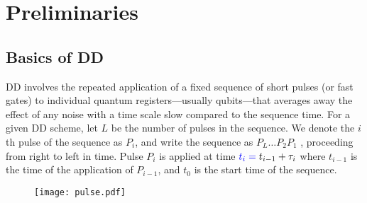 \documentclass[twocolumn,pra,superscriptaddress]{revtex4-2}
\begin{document}
\section{Preliminaries}
\noindent{}

\subsection{Basics of DD}

DD involves the repeated application of a fixed sequence of short pulses (or fast gates) to individual quantum registers---usually qubits---that averages away the effect of any noise with a time scale slow compared to the sequence time. For a given DD scheme, let $L$ be the number of pulses in the sequence. We denote the $i$th pulse of the sequence as $P_i$, and write the sequence as
$P_L \ldots P_2P_1$ ,
proceeding from right to left in time. Pulse $P_i$ is applied at time ${\color{blue}{t_i={} }}t_{i-1}+\tau_i$ where $t_{i-1}$ is the time of the application of $P_{i-1}$, and $t_0$ is the start time of the sequence. 
\begin{figure}[htbp]
 \texttt{[image: pulse.pdf]}
 \caption{ }
 \label{fig:pulses}
\end{figure}
\end{document}
